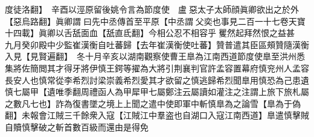 度徒洛翻】　辛酉以涇原留後姚令言為節度使　盧惡太子太師顔眞卿欲出之於外【惡烏路翻】眞卿謂曰先中丞傳首至平原【中丞謂父奕也事見二百一十七卷天寶十四載】眞卿以舌舐面血【舐直氐翻】今相公忍不相容乎矍然起拜然恨之益甚　九月癸卯殿中少監崔漢衡自吐蕃歸【去年崔漢衡使吐蕃】贊普遣其臣區頰贊隨漢衡入見【見賢遍翻】　冬十月辛亥以湖南觀察使曹王臯為江南西道節度使臯至洪州悉集將佐簡閲其才得牙將伊慎王鍔等擢為大將引荆襄判官許孟容置幕府慎兖州人孟容長安人也慎常從李希烈討梁崇義希烈愛其才欲留之慎逃歸希烈聞臯用慎恐為己患遺慎七屬甲【遺唯季翻周禮函人為甲犀甲七屬鄭注云屬讀如灌注之注謂上旅下旅札屬之數凡七也】詐為復書墜之境上上聞之遣中使即軍中斬慎臯為之論雪【臯為于偽翻】未報會江賊三千餘衆入寇【江賊江中羣盗也自湖口入寇江南西道】臯遣慎擊賊自贖慎擊破之斬首數百級而還由是得免
